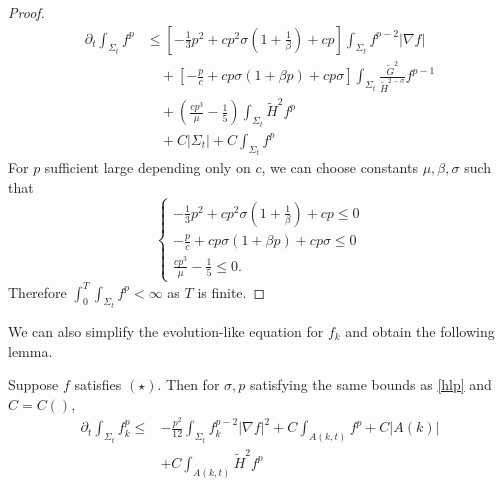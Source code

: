 \begin{proof}
    \begin{equation}
    \begin{split}
        \partial _t \int_{\Sigma_t} f^p 
    &\leq \left[ -\frac{1}{3}p^2+cp^2 \sigma (1+\frac{1}{\beta })+cp \right] \int_{\Sigma_t} f_{}^{p-2} \left| \nabla f \right|   \\
    &\quad + \left[ -\frac{p}{c}+cp \sigma (1+\beta p)+cp \sigma  \right] \int_{\Sigma_t} \frac{\tilde{G}^2}{\tilde{H}^{2-\sigma }}f^{p-1}\\
    &\quad + \left( \frac{cp^3}{\mu }-\frac{1}{5} \right) \int_{\Sigma_t} \tilde{H}^2f^{p}\\
    &\quad + C \left| \Sigma _t \right| + C \int_{\Sigma_t} f^p
    \end{split}
    \end{equation} 
    For $p$ sufficient large depending only on $c$, we can choose constants $\mu , \beta , \sigma $ such that
    \[
    \begin{cases}
        -\frac{1}{3}p^2+cp^2 \sigma (1+\frac{1}{\beta })+cp \leq 0\\
        -\frac{p}{c}+cp \sigma (1+\beta p)+cp \sigma \leq 0\\
        \frac{cp^3}{\mu }-\frac{1}{5} \leq 0.
    \end{cases}
    \]
    Therefore $\int_{0}^{T}\int_{\Sigma_t} f^p<\infty$ as $T$ is finite.
\end{proof}

We can also simplify the evolution-like equation for $f_k$ and obtain the following lemma.

\begin{lemma}
    Suppose $f$ satisfies $(\star )$. Then for $\sigma , p$ satisfying the same bounds as \autoref{hlp} and $C=C()$,
    \begin{equation*}
    \begin{split}
        \partial_t \int_{\Sigma_t} f_k^p \leq &  -\frac{p^2}{12} \int_{\Sigma_t} f_{k}^{p-2}\left| \nabla f \right| ^2+C \int_{A(k,t)} f^p +C \left| A(k) \right|\\ \quad &+ C \int_{A(k,t)}^{}\tilde{H}^2f^p\\
    \end{split}
    \end{equation*}  
\end{lemma}

